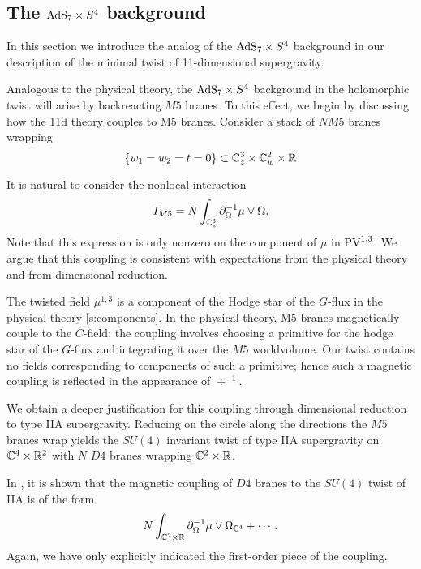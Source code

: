 \subsection{The ${\rm AdS}_7 \times S^4$ background}

In this section we introduce the analog of the ${\rm AdS}_7 \times S^4$ background in our description of the minimal twist of 11-dimensional supergravity. 



Analogous to the physical theory, the ${\rm AdS}_7 \times S^4$ background in the holomorphic twist will arise by backreacting $M5$ branes. To this effect, we begin by discussing how the 11d theory couples to M5 branes. 
Consider a stack of $N M5$ branes wrapping 
\[
\{w_1=w_2=t=0\} \subset \mathbb{C}^3_z\times \mathbb{C}^2_w\times \mathbb{R} 
\] 

It is natural to consider the nonlocal interaction 
\[
I_{M5} = N\int_{\mathbb{C}^3_z} \partial_{\Omega}^{-1}\mu \vee \Omega.
\]
Note that this expression is only nonzero on the component of $\mu$ in ${\rm PV}^{1,3}$. 
We argue that this coupling is consistent with expectations from the physical theory and from dimensional reduction. 

The twisted field $\mu^{1,3}$ is a component of the Hodge star of the $G$-flux in the physical theory \ref{s:components}. 
In the physical theory, M5 branes magnetically couple to the $C$-field; the coupling involves choosing a primitive for the hodge star of the $G$-flux and integrating it over the $M5$ worldvolume. Our twist contains no fields corresponding to components of such a primitive; hence such a magnetic coupling is reflected in the appearance of $\div^{-1}$. 

\parsec[]

We obtain a deeper justification for this coupling through dimensional reduction to type IIA supergravity. 
Reducing on the circle along the directions the $M5$ branes wrap yields the $SU(4)$ invariant twist of type IIA supergravity on $\mathbb C^4 \times \mathbb R^2$ with $N$ $D4$ branes wrapping $\mathbb C^2 \times \mathbb R$. 

In \cite{CLsugra}, it is shown that the magnetic coupling of $D4$ branes to the $SU(4)$ twist of IIA is of the form
\[
N \int _{\mathbb{C}^2 \times \mathbb R} \partial_{\Omega}^{-1} \mu \vee \Omega_{\mathbb{C}^4} + \cdots .
\]
Again, we have only explicitly indicated the first-order piece of the coupling. 

